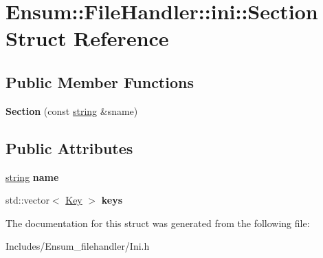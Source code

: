 \hypertarget{struct_ensum_1_1_file_handler_1_1ini_1_1_section}{}\section{Ensum\+:\+:File\+Handler\+:\+:ini\+:\+:Section Struct Reference}
\label{struct_ensum_1_1_file_handler_1_1ini_1_1_section}
\subsection*{Public Member Functions}
\begin{DoxyCompactItemize}
\item 
{\bfseries Section} (const \hyperlink{class_ensum_1_1string}{string} \&sname)\hypertarget{struct_ensum_1_1_file_handler_1_1ini_1_1_section_aece352bd19575c13a3359ee2a16f375d}{}\label{struct_ensum_1_1_file_handler_1_1ini_1_1_section_aece352bd19575c13a3359ee2a16f375d}

\end{DoxyCompactItemize}
\subsection*{Public Attributes}
\begin{DoxyCompactItemize}
\item 
\hyperlink{class_ensum_1_1string}{string} {\bfseries name}\hypertarget{struct_ensum_1_1_file_handler_1_1ini_1_1_section_aaef5921ebec35dfe6b7ac00cde2e71a6}{}\label{struct_ensum_1_1_file_handler_1_1ini_1_1_section_aaef5921ebec35dfe6b7ac00cde2e71a6}

\item 
std\+::vector$<$ \hyperlink{struct_ensum_1_1_file_handler_1_1ini_1_1_key}{Key} $>$ {\bfseries keys}\hypertarget{struct_ensum_1_1_file_handler_1_1ini_1_1_section_a4ef77125d407902a380c30d3f0f120da}{}\label{struct_ensum_1_1_file_handler_1_1ini_1_1_section_a4ef77125d407902a380c30d3f0f120da}

\end{DoxyCompactItemize}


The documentation for this struct was generated from the following file\+:\begin{DoxyCompactItemize}
\item 
Includes/\+Ensum\+\_\+filehandler/Ini.\+h\end{DoxyCompactItemize}
